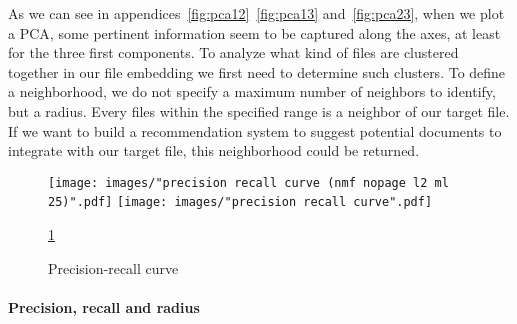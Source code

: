 \documentclass[a4paper]{article}
\begin{document}
	As we can see in appendices~\ref{fig:pca12}~\ref{fig:pca13} and~\ref{fig:pca23}, when we plot a \ac{PCA}, some pertinent information seem to be captured along the axes, at least for the three first components. To analyze what kind of files are clustered together in our file embedding we first need to determine such clusters. To define a neighborhood, we do not specify a maximum number of neighbors to identify, but a radius. Every files within the specified range is a neighbor of our target file. If we want to build a recommendation system to suggest potential documents to integrate with our target file, this neighborhood could be returned.
	
	\begin{figure}[]
		\texttt{[image: images/"precision recall curve (nmf nopage l2 ml 25)".pdf]}
		\label{fig:prc-gridsearch}
		\endminipage\hfill
		\texttt{[image: images/"precision recall curve".pdf]}
		\label{fig:prc-best}
		\endminipage
		\caption{Precision-recall curve}
		\label{fig:prc}
		\ref{fig:prc}
	\end{figure}
	
	\paragraph{Precision, recall and radius}
	
\end{document}

